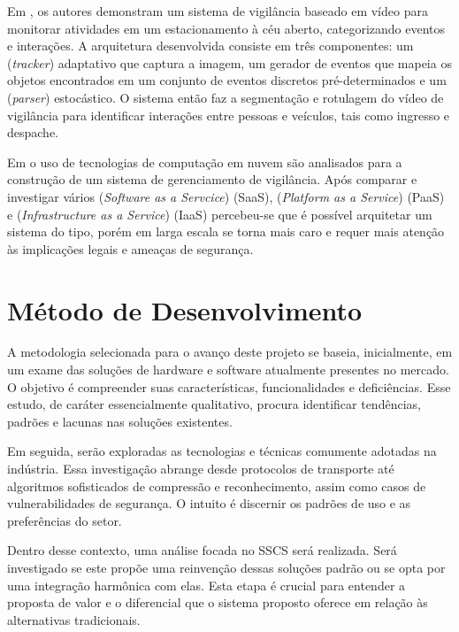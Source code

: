 \documentclass[12pt, %
openright, 
oneside, %
a4paper,    %
brazil]{facom-ufu-abntex2}
\begin{document}
Em , os autores demonstram um sistema de vigilância baseado
em vídeo para monitorar atividades em um estacionamento à céu aberto,
categorizando eventos e interações. A arquitetura desenvolvida consiste em três
componentes: um (\textit{\foreignlanguage{english}{tracker}}) adaptativo que
captura a imagem, um gerador de eventos que mapeia os objetos encontrados em um
conjunto de eventos discretos pré-determinados e um
(\textit{\foreignlanguage{english}{parser}}) estocástico. O sistema então faz a
segmentação e rotulagem do vídeo de vigilância para identificar interações
entre pessoas e veículos, tais como ingresso e despache.

Em  o uso de tecnologias de computação em nuvem são
analisados para a construção de um sistema de gerenciamento de vigilância. Após
comparar e investigar vários (\textit{\foreignlanguage{english}{Software as a
		Servcice}}) (SaaS), (\textit{\foreignlanguage{english}{Platform as a Service}})
(PaaS) e (\textit{\foreignlanguage{english}{Infrastructure as a Service}})
(IaaS) percebeu-se que é possível arquitetar um sistema do tipo, porém em larga
escala se torna mais caro e requer mais atenção às implicações legais e ameaças
de segurança.

\chapter{Método de Desenvolvimento}

A metodologia selecionada para o avanço deste projeto se baseia, inicialmente,
em um exame das soluções de hardware e software atualmente presentes no
mercado. O objetivo é compreender suas características, funcionalidades e
deficiências. Esse estudo, de caráter essencialmente qualitativo, procura
identificar tendências, padrões e lacunas nas soluções existentes.

Em seguida, serão exploradas as tecnologias e técnicas comumente adotadas na
indústria. Essa investigação abrange desde protocolos de transporte até
algoritmos sofisticados de compressão e reconhecimento, assim como casos de
vulnerabilidades de segurança. O intuito é discernir os padrões de uso e as
preferências do setor.

Dentro desse contexto, uma análise focada no SSCS será realizada. Será
investigado se este propõe uma reinvenção dessas soluções padrão ou se opta por
uma integração harmônica com elas. Esta etapa é crucial para entender a
proposta de valor e o diferencial que o sistema proposto oferece em relação às
alternativas tradicionais.
\end{document}
